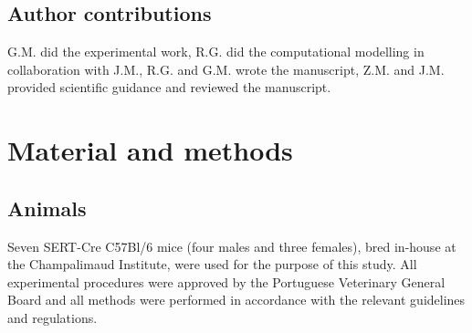 \documentclass[11pt,a4paper,onecolumn]{article}
\begin{document}
\subsection*{Author contributions}
G.M. did the experimental work, R.G. did the computational modelling in collaboration with J.M., R.G. and G.M. wrote the manuscript, Z.M. and J.M. provided scientific guidance and reviewed the manuscript.

\section*{Material and methods}
\vspace{-8pt}

\subsection*{Animals}
Seven SERT-Cre C57Bl/6 mice (four males and three females), bred in-house at the Champalimaud Institute, were used for the purpose of this study. All experimental procedures were approved by the Portuguese Veterinary General Board and all methods were performed in accordance with the relevant guidelines and regulations.
\end{document}
